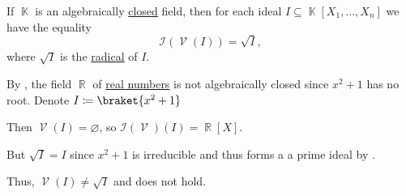 \begin{theorem}\label{thm:geometric_nullstellensatz}
  If \( \BbbK \) is an algebraically \hyperref[def:algebraically_closed_field]{closed} field, then for each ideal \( I \subseteq \BbbK[X_1, \ldots, X_n] \) we have the equality
  \begin{equation*}
    \mathcal{I}(\mscrV(I)) = \sqrt I,
  \end{equation*}
  where \( \sqrt I \) is the \hyperref[def:radical_ideal]{radical} of \( I \).
\end{theorem}

\begin{example}\label{ex:geometric_nullstellensatz_does_not_hold_for_reals}
  By , the field \( \BbbR \) of \hyperref[def:set_of_real_numbers]{real numbers} is not algebraically closed since \( x^2 + 1 \) has no root. Denote \( I \coloneqq \braket{x^2 + 1} \)

  Then \( \mscrV(I) = \varnothing \), so \( \mathcal{I}(\mscrV)(I) = \BbbR[X] \).

  But \( \sqrt{I} = I \) since \( x^2 + 1 \) is irreducible and thus forms a a prime ideal by .

  Thus, \( \mscrV(I) \neq \sqrt{I} \) and  does not hold.
\end{example}

